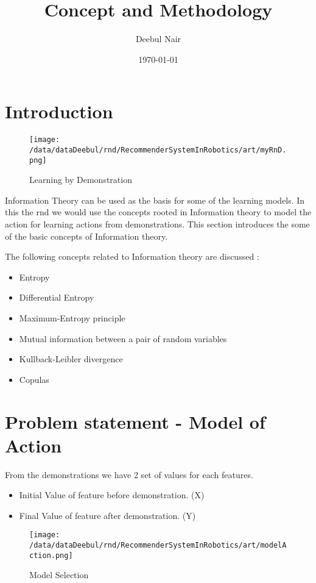 \documentclass[11pt]{article}
\title{\textbf{Concept and Methodology}}
\author{Deebul Nair}
\date{\today}
\begin{document}
\maketitle
\section{Introduction}

\begin{figure}[htp]
\centering
\texttt{[image: /data/dataDeebul/rnd/RecommenderSystemInRobotics/art/myRnD.png]}
\caption{Learning by Demonstration}
\label{Figure }
\end{figure}

Information Theory can be used as the basis for some of the learning models. In this the rnd we would use the concepts rooted in Information theory to model the action for learning actions from demonstrations. 
This section introduces the some of the basic concepts of Information theory.

The following concepts related to Information theory are discussed :
\begin{itemize}
	\item Entropy
	\item Differential Entropy
	\item Maximum-Entropy principle
	\item Mutual information between a pair of random variables
	\item Kullback-Leibler divergence
	\item Copulas
\end{itemize}


\section{Problem statement - Model of Action}
From the demonstrations we have 2 set of values for each features.
\begin{itemize}
	\item Initial Value of feature before demonstration. (X)
	\item Final Value of feature after demonstration. (Y) 
\end{itemize}

\begin{figure}[htp]
\centering
\texttt{[image: /data/dataDeebul/rnd/RecommenderSystemInRobotics/art/modelAction.png]}
\caption{Model Selection}
\label{Figure}
\end{figure}
\end{document}
